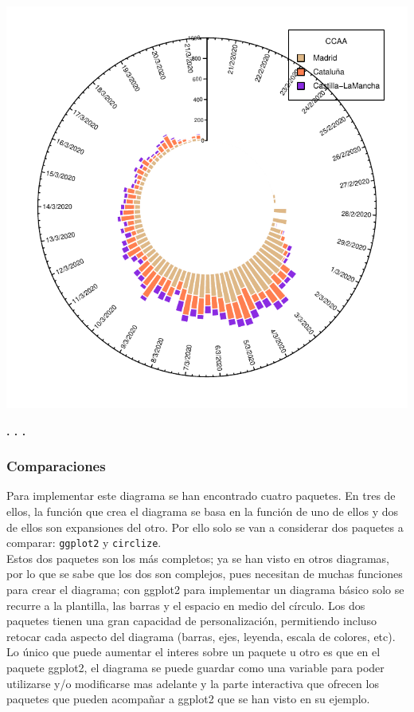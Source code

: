 \documentclass{article}\usepackage[]{graphicx}\usepackage[]{color}
\makeatletter
\def\maxwidth{ %
  \ifdim\Gin@nat@width>\linewidth
    \linewidth
  \else
    \Gin@nat@width
  \fi
}
\newenvironment{knitrout}{}{} %
\makeatother
\begin{document}
\begin{knitrout}
\color{fgcolor}

{\centering \includegraphics[width=\maxwidth]{figure/circlize_col_sep-1} 

}



\end{knitrout}
\begin{center}
\textbf{. . .}
\end{center}
\subsubsection{Comparaciones}
Para implementar este diagrama se han encontrado cuatro paquetes. En tres de ellos, la funci\'on que crea el diagrama se basa en la funci\'on de uno de ellos y dos de ellos son expansiones del otro. Por ello solo se van a considerar dos paquetes a comparar: \texttt{ggplot2} y \texttt{circlize}.~\\
Estos dos paquetes son los m\'as completos; ya se han visto en otros diagramas, por lo que se sabe que los dos son complejos, pues necesitan de muchas funciones para crear el diagrama; con ggplot2 para implementar un diagrama b\'asico solo se recurre a la plantilla, las barras y el espacio en medio del c\'irculo. Los dos paquetes tienen una gran capacidad de personalizaci\'on, permitiendo incluso retocar cada aspecto del diagrama (barras, ejes, leyenda, escala de colores, etc). Lo \'unico que puede aumentar el interes sobre un paquete u otro es que en el paquete ggplot2, el diagrama se puede guardar como una variable para poder utilizarse y/o modificarse mas adelante y la parte interactiva que ofrecen los paquetes que pueden acompa\~nar a ggplot2 que se han visto en su ejemplo.
\clearpage
\end{document}
